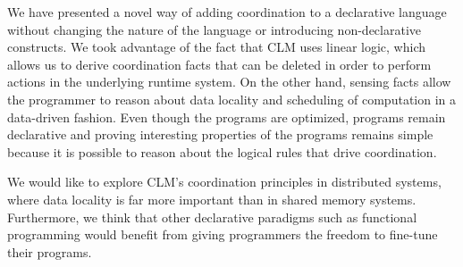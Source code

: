 We have presented a novel way of adding coordination to a declarative language without
changing the nature of the language or introducing non-declarative constructs. We
took advantage of the fact that CLM uses linear logic, which allows us to derive
coordination facts that can be deleted in order to perform actions in the underlying
runtime system. On the other hand, sensing facts allow the programmer to reason
about data locality and scheduling of computation in a data-driven fashion.
Even though the programs are optimized, programs remain declarative and proving
interesting properties of the programs remains simple because it is possible to
reason about the logical rules that drive coordination.

We would like to explore CLM's coordination principles in distributed systems,
where data locality is far more important than in shared memory systems.
Furthermore, we think that other declarative paradigms such as functional
programming would benefit from giving programmers the freedom to fine-tune their
programs.
